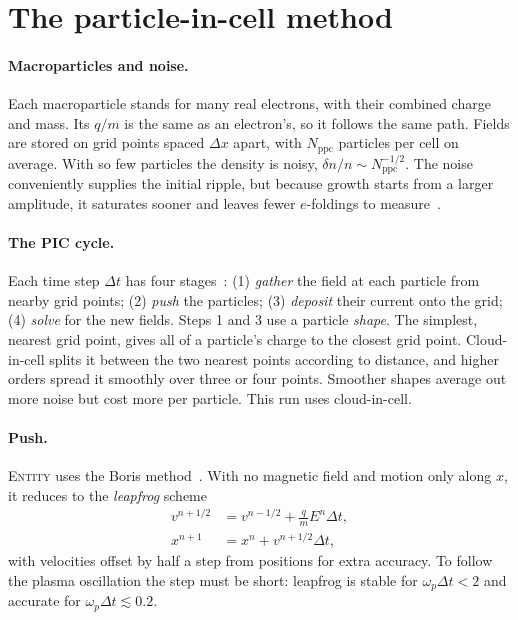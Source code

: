 \documentclass[10pt,twocolumn,letterpaper]{article}
\newcommand{\wpe}{\omega_{p}}         %
\newcommand{\ppc}{N_\mathrm{ppc}}     %
\begin{document}
\section{The particle-in-cell method}
\label{sec:pic}

\paragraph{Macroparticles and noise.}
Each macroparticle stands for many real electrons, with their combined charge and mass. Its
$q/m$ is the same as an electron's, so it follows the same path. Fields are stored on grid
points spaced $\Delta x$ apart, with $\ppc$ particles per cell on average. With so few particles
the density is noisy, $\delta n/n\sim\ppc^{-1/2}$. The noise conveniently supplies the initial
ripple, but because growth starts from a larger amplitude, it saturates sooner and leaves fewer
$e$-foldings to measure~\citep{BirdsallLangdon1991}.

\paragraph{The PIC cycle.}
Each time step $\Delta t$ has four stages~\citep{BirdsallLangdon1991,HockneyEastwood1988}:
(1) \emph{gather} the field at each particle from nearby grid points; (2) \emph{push} the
particles; (3) \emph{deposit} their current onto the grid; (4) \emph{solve} for the new fields.
Steps 1 and 3 use a particle \emph{shape}. The simplest, nearest grid point, gives all of a
particle's charge to the closest grid point. Cloud-in-cell splits it between the two nearest
points according to distance, and higher orders spread it smoothly over three or four points.
Smoother shapes average out more noise but cost more per particle. This run uses cloud-in-cell.

\paragraph{Push.}
\textsc{Entity} uses the Boris method~\citep{Boris1970}. With no magnetic field and motion only
along $x$, it reduces to the \emph{leapfrog} scheme
\begin{equation}
  \begin{aligned}
    v^{n+1/2} &= v^{n-1/2} + \tfrac{q}{m}E^{n}\Delta t,\\
    x^{n+1} &= x^{n} + v^{n+1/2}\Delta t,
  \end{aligned}
\end{equation}
with velocities offset by half a step from positions for extra accuracy. To follow the plasma
oscillation the step must be short: leapfrog is stable for $\wpe\Delta t<2$ and accurate for
$\wpe\Delta t\lesssim0.2$.
\end{document}
